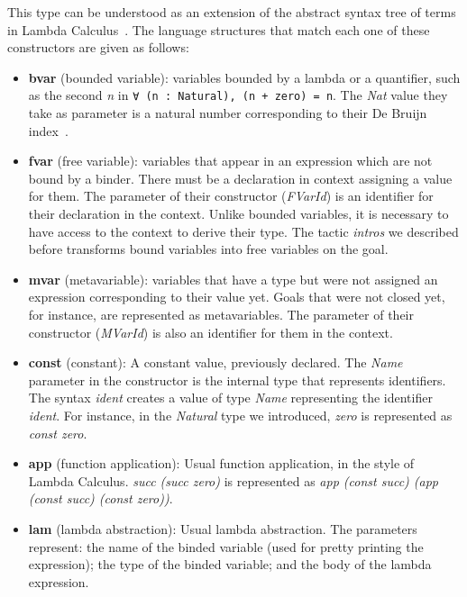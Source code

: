 This type can be understood as an extension of the abstract syntax tree of terms in Lambda Calculus~\cite{lcIntro}. The language structures that match each one of these constructors are given as follows:
\begin{itemize}
  \item \textbf{bvar} (bounded variable): variables bounded by a lambda or a quantifier, such as the second \textit{n} in  \texttt{∀ (n : Natural), (n + zero) = n}. The \textit{Nat} value they take as parameter is a natural number corresponding to their De Bruijn index~\cite{debruijnIndices}.
  \item \textbf{fvar} (free variable): variables that appear in an expression which are not bound by a binder. There must be a declaration in context assigning a value for them.  The parameter of their constructor (\textit{FVarId}) is an identifier for their declaration in the context. Unlike bounded variables, it is necessary to have access to the context to derive their type. The tactic \textit{intros} we described before transforms bound variables into free variables on the goal.
  \item \textbf{mvar} (metavariable): variables that have a type but were not assigned an expression corresponding to their value yet. Goals that were not closed yet, for instance, are represented as metavariables. The parameter of their constructor (\textit{MVarId}) is also an identifier for them in the context.
  \item \textbf{const} (constant): A constant value, previously declared. The \textit{Name} parameter in the constructor is the internal type that represents identifiers. The syntax \textit{\textasciigrave ident} creates a value of type \textit{Name} representing the identifier \textit{ident}. For instance, in the \textit{Natural} type we introduced, \textit{zero} is represented as \textit{const \textasciigrave zero}.
  \item \textbf{app} (function application): Usual function application, in the style of Lambda Calculus. \textit{succ (succ zero)} is represented as \textit{app (const \textasciigrave succ) (app (const \textasciigrave succ) (const \textasciigrave zero))}.
  \item \textbf{lam} (lambda abstraction): Usual lambda abstraction. The parameters represent: the name of the binded variable (used for pretty printing the expression); the type of the binded variable; and the body of the lambda expression.

\end{itemize}
